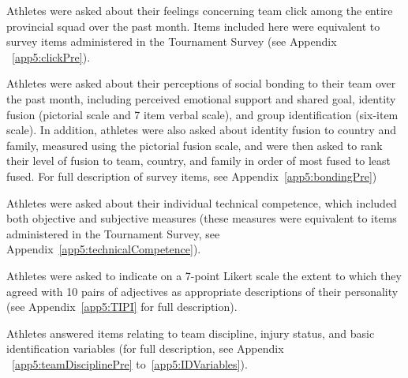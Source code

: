 Athletes were asked about their feelings concerning team click among the entire provincial squad over the past month. Items included here were equivalent to survey items administered in the Tournament Survey (see Appendix ~\ref{app5:clickPre}).

Athletes were asked about their perceptions of social bonding to their team over the past month, including perceived emotional support and shared goal, identity fusion (pictorial scale and 7 item verbal scale), and group identification (six-item scale). In addition, athletes were also asked about identity fusion to country and family, measured using the pictorial fusion scale, and were then asked to rank their level of fusion to team, country, and family in order of most fused to least fused.  For full description of survey items, see Appendix~\ref{app5:bondingPre})

Athletes were asked about their individual technical competence, which included both objective and subjective measures (these measures were equivalent to items administered in the Tournament Survey, see Appendix~\ref{app5:technicalCompetence}).

Athletes were asked to indicate on a 7-point Likert scale the extent to which they agreed with 10 pairs of adjectives as appropriate descriptions of their personality (see Appendix~\ref{app5:TIPI} for full description).

Athletes answered items relating to team discipline, injury status, and basic identification variables (for full description, see Appendix ~\ref{app5:teamDisciplinePre} to~\ref{app5:IDVariables}).




